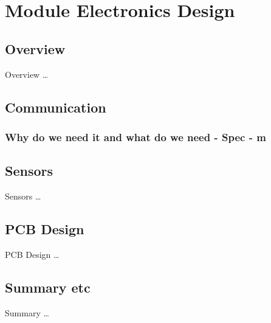 \chapter{Module Electronics Design} \label{Chapter:ModuleElecDesign}

\section{Overview}
Overview \dots

\section{Communication}
\subsection{Why do we need it and what do we need -  Spec - m}







\section{Sensors}
Sensors \dots

\section{PCB Design}
PCB Design \dots

\section{Summary etc}
Summary \dots